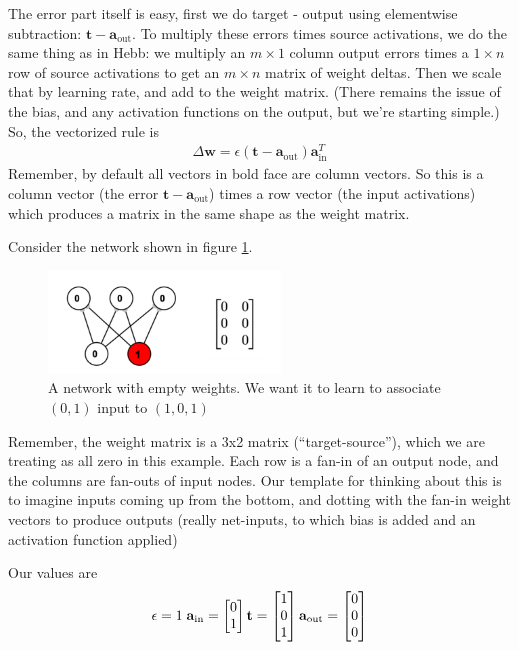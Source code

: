 The error part itself is easy, first we do target - output using elementwise subtraction: $\mathbf{t} - \mathbf{a}_{\text{out}}$.  To multiply these errors times source activations, we do the same thing as in Hebb: we multiply an $m \times  1$ column output errors times a $1 \times  n$ row of source activations to get an $m \times n$ matrix of weight deltas.  Then we scale that by learning rate, and add to the weight matrix.  (There remains the issue of the bias, and any activation functions on the output, but we're starting simple.) So, the vectorized rule is
\begin{eqnarray*}
\Delta \mathbf{w}  =  \epsilon (\mathbf{t} - \mathbf{a}_{\text{out}}) \mathbf{a}_{\text{in}}^T
\end{eqnarray*}
Remember, by default all vectors in bold face are column vectors.  So this is a column vector (the error $\mathbf{t} - \mathbf{a}_{\text{out}}$) times a row vector (the input activations) which produces a matrix in the same shape as the weight matrix.

Consider the network shown in figure \ref{lms_vector_pre}.

\begin{figure}[h]
\centering
\includegraphics[width=0.55\textwidth]{images/vectorLMSBeforeTrain.png}
\caption[Jeff Yoshimi.]{A network with empty weights. We want it to learn to associate $(0,1)$ input to $(1,0,1)$}
\label{lms_vector_pre}
\end{figure}

Remember, the weight matrix is a 3x2 matrix  (``target-source''), which we are treating as all zero in this example. Each row is a fan-in of an output node, and the columns are fan-outs of input nodes. Our template for thinking about this is to imagine inputs coming up from the bottom, and dotting with the fan-in weight vectors to produce outputs (really net-inputs, to which bias is added and an activation function applied)

Our values are
\begin{equation*}
\epsilon = 1 \; \; \\
\mathbf{a}_{\text{in}} = \begin{bmatrix} 0 \\ 1 \end{bmatrix} \\
\mathbf{t} = \begin{bmatrix} 1 \\ 0 \\ 1 \end{bmatrix}
\mathbf{a}_{\text{out}} = \begin{bmatrix} 0 \\ 0 \\ 0 \end{bmatrix}
\end{equation*}

